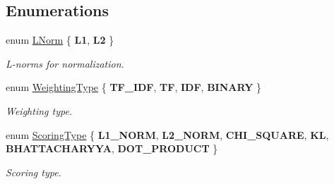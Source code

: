 \subsection*{Enumerations}
\begin{DoxyCompactItemize}
\item 
\mbox{\label{namespaceDBoW2_a53e9e0bcfc25c861815e413a7cf3fa51}} 
enum \hyperlink{namespaceDBoW2_a53e9e0bcfc25c861815e413a7cf3fa51}{L\+Norm} \{ {\bfseries L1}, 
{\bfseries L2}
 \}\begin{DoxyCompactList}\small\item\em L-\/norms for normalization. \end{DoxyCompactList}
\item 
\mbox{\label{namespaceDBoW2_a5de5c8a307aca9a84ffefda2a9bc467a}} 
enum \hyperlink{namespaceDBoW2_a5de5c8a307aca9a84ffefda2a9bc467a}{Weighting\+Type} \{ {\bfseries T\+F\+\_\+\+I\+DF}, 
{\bfseries TF}, 
{\bfseries I\+DF}, 
{\bfseries B\+I\+N\+A\+RY}
 \}\begin{DoxyCompactList}\small\item\em Weighting type. \end{DoxyCompactList}
\item 
\mbox{\label{namespaceDBoW2_aa252a592dd607c6e60dede06ceef2722}} 
enum \hyperlink{namespaceDBoW2_aa252a592dd607c6e60dede06ceef2722}{Scoring\+Type} \{ \newline
{\bfseries L1\+\_\+\+N\+O\+RM}, 
{\bfseries L2\+\_\+\+N\+O\+RM}, 
{\bfseries C\+H\+I\+\_\+\+S\+Q\+U\+A\+RE}, 
{\bfseries KL}, 
\newline
{\bfseries B\+H\+A\+T\+T\+A\+C\+H\+A\+R\+Y\+YA}, 
{\bfseries D\+O\+T\+\_\+\+P\+R\+O\+D\+U\+CT}
 \}\begin{DoxyCompactList}\small\item\em Scoring type. \end{DoxyCompactList}
\end{DoxyCompactItemize}
